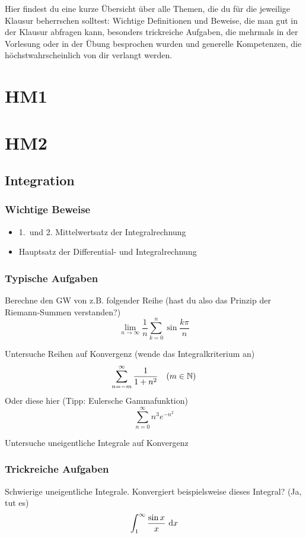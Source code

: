 Hier findest du eine kurze Übersicht über alle Themen, die du für die jeweilige
Klausur beherrschen solltest:
Wichtige Definitionen und Beweise, die man gut in der Klausur abfragen kann,
besonders trickreiche Aufgaben, die mehrmals in der Vorlesung oder in der Übung
besprochen wurden und generelle Kompetenzen, die höchstwahrscheinlich von dir
verlangt werden.
\chapter{HM1}
\chapter{HM2}
\section{Integration}

\subsection{Wichtige Beweise}
\begin{itemize}
  \item 1.\ und 2. Mittelwertsatz der Integralrechnung
  \item Hauptsatz der Differential- und Integralrechnung
\end{itemize}

\subsection{Typische Aufgaben}
Berechne den GW von z.B. folgender Reihe (hast du also das Prinzip der Riemann-Summen verstanden?)
\begin{equation*}
    \lim\limits_{n \rightarrow \infty}{\frac{1}{n}\sum_{k=0}^n \sin{\frac{k\pi}{n}}}
\end{equation*}

Untersuche Reihen auf Konvergenz (wende das Integralkriterium an)
\begin{equation*}
    \sum_{n=-m}^\infty \frac{1}{1+n^2} \quad (m \in \mathbb{N})
\end{equation*}
Oder diese hier (Tipp: Eulersche Gammafunktion)
\begin{equation*}
    \sum_{n=0}^\infty n^3 e^{-n^2}
\end{equation*}

Untersuche uneigentliche Integrale auf Konvergenz

\subsection{Trickreiche Aufgaben}
Schwierige uneigentliche Integrale. Konvergiert beispielsweise dieses Integral? (Ja, tut es)
\begin{equation*}
    \int_1^\infty \frac{\sin{x}}{x}\text{ d}x
\end{equation*}


